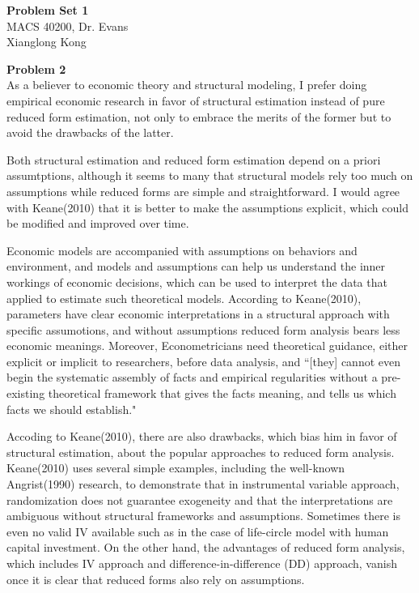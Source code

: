\documentclass[letterpaper,12pt]{article}
\theoremstyle{definition}
\begin{document}
\begin{flushleft}
  \textbf{\large{Problem Set 1}} \\
  MACS 40200, Dr. Evans \\
  Xianglong Kong
\end{flushleft}

\vspace{5mm}

\noindent\textbf{Problem 2} \\
As a believer to economic theory and structural modeling, I prefer doing empirical economic research in favor of structural estimation instead of pure reduced form estimation, not only to embrace the merits of the former but to avoid the drawbacks of the latter.

Both structural estimation and reduced form estimation depend on a priori assumtptions, although it seems to many that structural models rely too much on assumptions while reduced forms are simple and straightforward. I would agree with Keane(2010) that it is better to make the assumptions explicit, which could be modified and improved over time. 

Economic models are accompanied with assumptions on behaviors and environment, and models and assumptions can help us understand the inner workings of economic decisions, which can be used to interpret the data that applied to estimate such theoretical models. According to Keane(2010), parameters have clear economic interpretations in a structural approach with specific assumotions, and without assumptions reduced form analysis bears less economic meanings. Moreover, Econometricians need theoretical guidance, either explicit or implicit to researchers, before data analysis, and ``[they] cannot even begin the systematic assembly of facts and empirical regularities without a pre-existing theoretical framework that gives the facts meaning, and tells us which facts we should establish." 

Accoding to Keane(2010), there are also drawbacks, which bias him in favor of structural estimation, about the popular approaches to reduced form analysis. Keane(2010) uses several simple examples, including the well-known Angrist(1990) research, to demonstrate that in instrumental variable approach, randomization does not guarantee exogeneity and that the interpretations are ambiguous without structural frameworks and assumptions. Sometimes there is even no valid IV available such as in the case of life-circle model with human capital investment. On the other hand, the advantages of reduced form analysis, which includes IV approach and difference-in-difference (DD) approach, vanish once it is clear that reduced forms also rely on assumptions.
\end{document}
